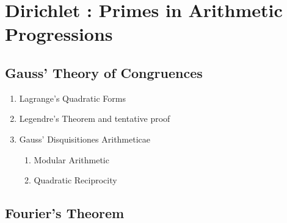 \chapter{Dirichlet : Primes in Arithmetic Progressions}

\section{Gauss' Theory of Congruences}

\td

\begin{enumerate}
    \item Lagrange's Quadratic Forms 
    \item Legendre's Theorem and tentative proof
    \item Gauss' Disquisitiones Arithmeticae
    \begin{enumerate}
        \item Modular Arithmetic
        \item Quadratic Reciprocity 
    \end{enumerate}
\end{enumerate}

\noindent\td 

\section{Fourier's Theorem}

\td


